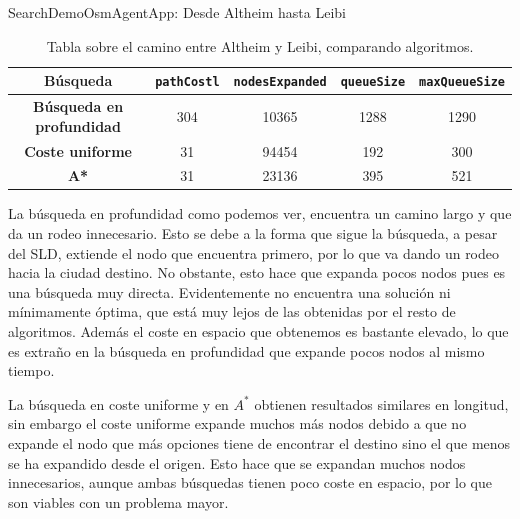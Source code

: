 \documentclass[11pt, a4paper, spanish, openright, twoside]{book}
\begin{document}
\begin{section}{SearchDemoOsmAgentApp: Desde Altheim hasta Leibi}

	\begin{table}	
		\begin{center}
			\begin{tabular}{|c||c|c|c|c|}		
				\hline	Búsqueda					& \texttt{pathCostl} 	& \texttt{nodesExpanded}	& \texttt{queueSize} 	& \texttt{maxQueueSize}\\ \hline \hline
				\textbf{Búsqueda en profundidad} 		& 	304			& 	10365				& 	1288			& 1290	  \\ \hline 
				\textbf{Coste uniforme}  				&  	31			& 	94454	 			& 	192			& 300	 \\ \hline 	
				\textbf{A*}  					&  	31			& 	23136	 			& 	395			& 521	 \\ \hline 	
			\end{tabular}
		\caption{Tabla sobre el camino entre Altheim y Leibi, comparando algoritmos.}
		\end{center}
	\end{table}
	La búsqueda en profundidad como podemos ver, encuentra un camino largo  y que da un rodeo innecesario. Esto se debe a la forma que sigue la búsqueda, a pesar del SLD, extiende el nodo que encuentra primero, por lo que va dando un rodeo hacia la ciudad destino. No obstante, esto hace que expanda pocos nodos pues es una búsqueda muy directa. Evidentemente no encuentra una solución ni mínimamente óptima, que está muy lejos de las obtenidas por el resto de algoritmos. Además el coste en espacio que obtenemos es bastante elevado, lo que es extraño en la búsqueda en profundidad que expande pocos nodos al mismo tiempo.
	
		La búsqueda en coste uniforme y en $A^*$ obtienen resultados similares en longitud, sin embargo el coste uniforme expande muchos más nodos debido a que no expande el nodo que más opciones tiene de encontrar el destino sino el que menos se ha expandido desde el origen. Esto hace que se expandan muchos nodos innecesarios, aunque ambas búsquedas tienen poco coste en espacio, por lo que son viables con un problema mayor.
\end{section}
\end{document}
